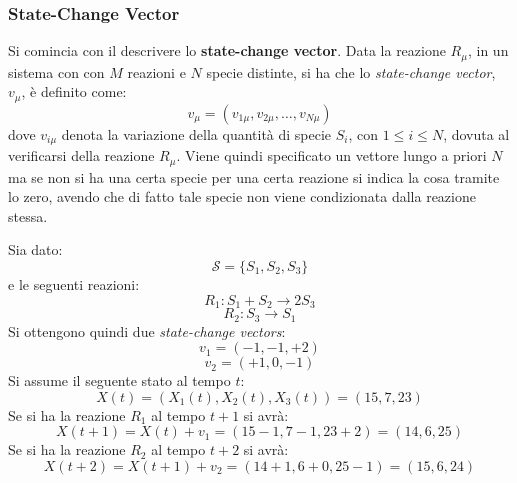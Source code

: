 \documentclass[a4paper,12pt, oneside]{book}
\begin{document}
\subsubsection{State-Change Vector}
Si comincia con il descrivere lo \textbf{state-change vector}. Data la reazione
$R_\mu$, in un sistema con con $M$ reazioni e $N$
specie distinte, si ha che lo \textit{state-change vector}, $v_\mu$, è definito
come: 
\[v_\mu=(v_{1\mu},v_{2\mu},\ldots, v_{N\mu})\]
dove $v_{i\mu}$ denota la variazione della quantità di specie $S_i$, con $1\leq
i\leq N$, dovuta al verificarsi della reazione $R_\mu$. Viene quindi specificato
un vettore lungo a priori $N$ ma se non si ha una certa specie per una certa
reazione si indica la cosa tramite lo zero, avendo che di fatto tale specie non
viene condizionata dalla reazione stessa.
\begin{esempio}
  Sia dato:
  \[\mathcal{S}=\{S_1,S_2,S_3\}\]
  e le seguenti reazioni:
  \[R_1:S_1+S_2\to 2S_3\]
  \[R_2: S_3\to S_1\]
  Si ottengono quindi due \textit{state-change vectors}:
  \[v_1=(-1,-1,+2)\]
  \[v_2=(+1,0,-1)\]
  Si assume il seguente stato al tempo $t$:
  \[X(t)=\left( X_1(t), X_2(t), X_3(t)\right) = (15,7,23)\]
  Se si ha la reazione $R_1$ al tempo $t+1$ si avrà:
  \[X(t+1)=X(t)+v_1=(15-1,7-1,23+2)=(14,6,25)\]
  Se si ha la reazione $R_2$ al tempo $t+2$ si avrà:
  \[X(t+2)=X(t+1)+v_2=(14+1,6+0,25-1)=(15,6,24)\]
\end{esempio}
\end{document}
